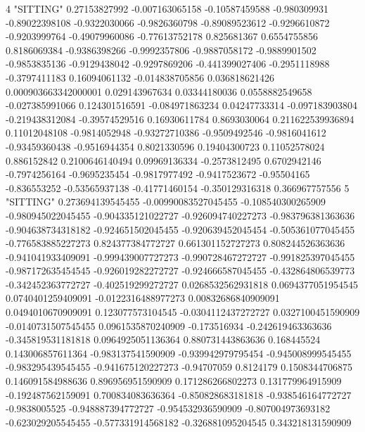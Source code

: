 4 "SITTING" 0.27153827992 -0.007163065158 -0.10587459588 -0.980309931 -0.89022398108 -0.9322030066 -0.9826360798 -0.89089523612 -0.9296610872 -0.9203999764 -0.49079960086 -0.77613752178 0.825681367 0.6554755856 0.8186069384 -0.9386398266 -0.9992357806 -0.9887058172 -0.9889901502 -0.9853835136 -0.9129438042 -0.9297869206 -0.441399027406 -0.2951118988 -0.3797411183 0.16094061132 -0.014838705856 0.036818621426 0.000903663342000001 0.029143967634 0.03344180036 0.0558882549658 -0.027385991066 0.124301516591 -0.084971863234 0.04247733314 -0.097183903804 -0.219438312084 -0.39574529516 0.16930611784 0.8693030064 0.211622539936894 0.11012048108 -0.9814052948 -0.93272710386 -0.9509492546 -0.9816041612 -0.93459360438 -0.9516944354 0.8021330596 0.19404300723 0.11052578024 0.886152842 0.2100646140494 0.09969136334 -0.2573812495 0.6702942146 -0.7974256164 -0.9695235454 -0.9817977492 -0.9417523672 -0.95504165 -0.836553252 -0.53565937138 -0.41771460154 -0.350129316318 0.366967757556
5 "SITTING" 0.273694139545455 -0.00990083527045455 -0.108540300265909 -0.980945022045455 -0.904335121022727 -0.926094740227273 -0.983796381363636 -0.904638734318182 -0.924651502045455 -0.920639452045454 -0.505361077045455 -0.776583885227273 0.824377384772727 0.661301152727273 0.808244526363636 -0.941041933409091 -0.999439007727273 -0.990728467272727 -0.991825397045455 -0.987172635454545 -0.926019282272727 -0.924666587045455 -0.432864806539773 -0.342452363772727 -0.402519299272727 0.0268532562931818 0.0694377051954545 0.0740401259409091 -0.0122316488977273 0.00832686840909091 0.0494010670909091 0.123077573104545 -0.0304112437272727 0.0327100451590909 -0.0140731507545455 0.0961535870240909 -0.173516934 -0.242619463363636 -0.345819531181818 0.0964925051136364 0.880731443863636 0.168445524 0.143006857611364 -0.983137541590909 -0.939942979795454 -0.945008999545455 -0.983295439545455 -0.941675120227273 -0.94707059 0.8124179 0.1508344706875 0.146091584988636 0.896956951590909 0.171286266802273 0.131779964915909 -0.192487562159091 0.700834083636364 -0.850828683181818 -0.938546164772727 -0.9838005525 -0.948887394772727 -0.954532936590909 -0.807004973693182 -0.623029205545455 -0.577331914568182 -0.326881095204545 0.343218131590909
